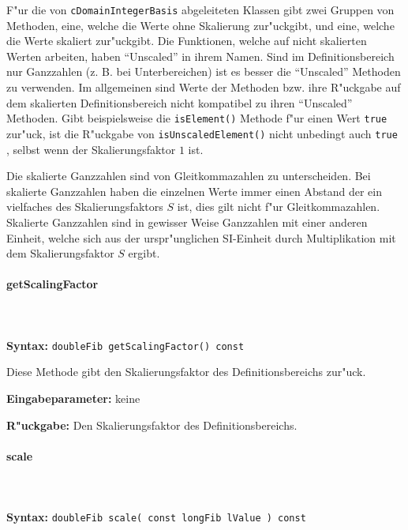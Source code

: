 F"ur die von \verb|cDomainIntegerBasis| abgeleiteten Klassen gibt zwei Gruppen von Methoden, eine, welche die Werte ohne Skalierung zur"uckgibt, und eine, welche die Werte skaliert zur"uckgibt. Die Funktionen, welche auf nicht skalierten Werten arbeiten, haben ``Unscaled'' in ihrem Namen. Sind im Definitionsbereich nur Ganzzahlen (z. B. bei Unterbereichen) ist es besser die ``Unscaled'' Methoden zu verwenden. Im allgemeinen sind Werte der Methoden bzw. ihre R"uckgabe auf dem skalierten Definitionsbereich nicht kompatibel zu ihren ``Unscaled'' Methoden. Gibt beispielsweise die \verb|isElement()| Methode f"ur einen Wert \verb|true| zur"uck, ist die R"uckgabe von \verb|isUnscaledElement()| nicht unbedingt auch \verb|true| , selbst wenn der Skalierungsfaktor $1$ ist.

Die skalierte Ganzzahlen sind von Gleitkommazahlen zu unterscheiden. Bei skalierte Ganzzahlen haben die einzelnen Werte immer einen Abstand der ein vielfaches des Skalierungsfaktors $S$ ist, dies gilt nicht f"ur Gleitkommazahlen. Skalierte Ganzzahlen sind in gewisser Weise Ganzzahlen mit einer anderen Einheit, welche sich aus der urspr"unglichen SI-Einheit durch Multiplikation mit dem Skalierungsfaktor $S$ ergibt.


\paragraph{getScalingFactor}

\ \\\\\noindent
\textbf{Syntax:} \verb|doubleFib getScalingFactor() const|

\bigskip\noindent
Diese Methode gibt den Skalierungsfaktor des Definitionsbereichs zur"uck.

\bigskip\noindent
\textbf{Eingabeparameter:} keine

\bigskip\noindent
\textbf{R"uckgabe:} Den Skalierungsfaktor des Definitionsbereichs.


\paragraph{scale}

\ \\\\\noindent
\textbf{Syntax:} \verb|doubleFib scale( const longFib lValue ) const|

